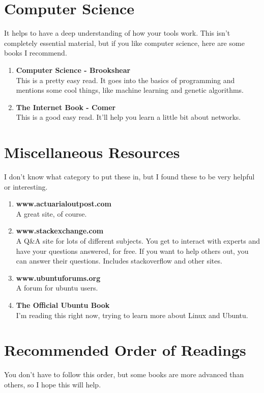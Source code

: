 \documentclass[oneside, titlepage]{article}
\begin{document}
\section{Computer Science}
It helps to have a deep understanding of how your tools work. This isn't completely essential material, but if you like computer science, here are some books I recommend.

\begin{enumerate}
\item{\bfseries Computer Science - Brookshear}\\
This is a pretty easy read. It goes into the basics of programming and mentions some cool things, like machine learning and genetic algorithms.

\item{\bfseries The Internet Book - Comer}\\
This is a good easy read. It'll help you learn a little bit about networks.
\end{enumerate}

\section{Miscellaneous Resources}
I don't know what category to put these in, but I found these to be very helpful or interesting.

\begin{enumerate}
\item{\bfseries www.actuarialoutpost.com}\\
A great site, of course.
\item{\bfseries www.stackexchange.com}\\
A Q\&A site for lots of different subjects. You get to interact with experts and have your questions answered, for free. If you want to help others out, you can answer their questions. Includes stackoverflow and other sites.
\item{\bfseries www.ubuntuforums.org}\\
A forum for ubuntu users.
\item{\bfseries The Official Ubuntu Book}\\
I'm reading this right now, trying to learn more about Linux and Ubuntu.
\end{enumerate}

\section{Recommended Order of Readings}
You don't have to follow this order, but some books are more advanced than others, so I hope this will help.
\end{document}
